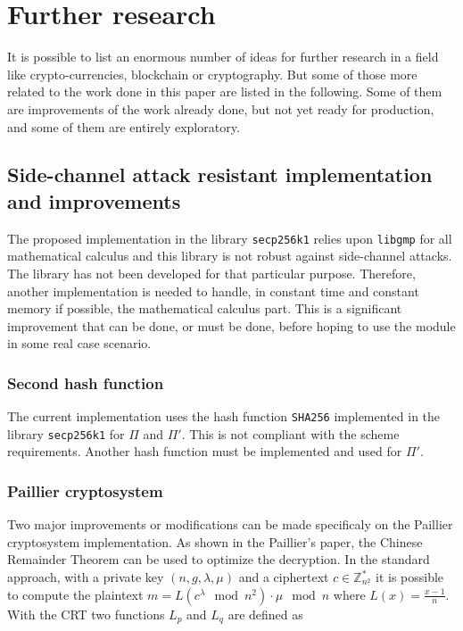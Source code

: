 \chapter{Further research}
\label{chap:furtherResearch}

It is possible to list an enormous number of ideas for further research in a field
like crypto-currencies, blockchain or cryptography. But some of those more related to the work
done in this paper are listed in the following. Some of them are improvements of
the work already done, but not yet ready for production, and some of them are
entirely exploratory.

\section{Side-channel attack resistant implementation and improvements}

The proposed implementation in the library \texttt{secp256k1} relies upon
\texttt{libgmp} for all mathematical calculus and this library is
not robust against side-channel attacks. The library has not
been developed for that particular purpose. Therefore, another implementation
is needed to handle, in constant time and constant memory if
possible, the mathematical calculus part. This is a significant improvement that
can be done, or must be done, before hoping to use the module in some real case
scenario.

\subsection{Second hash function}

The current implementation uses the hash function \texttt{SHA256} implemented
in the library \texttt{secp256k1} for $\Pi$ and $\Pi'$. This is not compliant
with the scheme requirements. Another hash function must be implemented
and used for $\Pi'$.

\subsection{Paillier cryptosystem}

Two major improvements or modifications can be made specificaly on the
Paillier cryptosystem implementation. As shown in the Paillier's paper, the
Chinese Remainder Theorem can be used to optimize the decryption. In the
standard approach, with a private key $(n, g, \lambda, \mu)$ and a ciphertext $c
\in \mathbb{Z}_{n^2}^*$ it is possible to compute the plaintext $m =
L(c^{\lambda} \mod n^2) \cdot \mu \mod n$ where $L(x) = \frac{x-1}{n}$. With the
CRT two functions $L_p$ and $L_q$ are defined as

